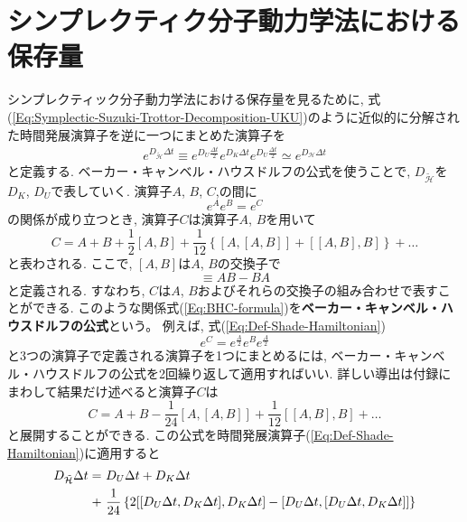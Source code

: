 \section{シンプレクティク分子動力学法における保存量}
シンプレクティック分子動力学法における保存量を見るために, 式(\ref{Eq:Symplectic-Suzuki-Trottor-Decomposition-UKU})のように近似的に分解された時間発展演算子を逆に一つにまとめた演算子を
\begin{align}
  e^{D_{\tilde{\mathcal{H}}} \Delta t}
  \equiv
  e^{D_{U} \frac{\Delta t}{2}}
  e^{D_{K} \Delta t}
  e^{D_{U} \frac{\Delta t}{2}}
  \simeq
  e^{D_{\mathcal{H}} \Delta t}
  \label{Eq:Def-Shade-Hamiltonian}
\end{align}
と定義する.
ベーカー・キャンベル・ハウスドルフの公式を使うことで, $D_{\tilde{\mathcal{H}}}$を$D_{K}$, $D_{U}$で表していく.
演算子$A$, $B$, $C$,の間に
\begin{equation}
  e^{A}e^{B} = e^{C}
\end{equation}
の関係が成り立つとき, 演算子$C$は演算子$A$, $B$を用いて
\begin{equation}
  C = A + B
    + \frac{1}{2} [A, B]
    + \frac{1}{12}
      \left\{
        [A, [A,B]] + [[A,B], B]
      \right\}
    + \ldots
  \label{Eq:BHC-formula}
\end{equation}
と表わされる. ここで, $[A, B]$は$A$, $B$の交換子で
\begin{equation}
  [A, B] \equiv AB - BA
\end{equation}
と定義される. すなわち, $C$は$A$, $B$およびそれらの交換子の組み合わせで表すことができる. 
このような関係式(\ref{Eq:BHC-formula})を\textbf{ベーカー・キャンベル・ハウスドルフの公式}という。
例えば, 式(\ref{Eq:Def-Shade-Hamiltonian})
\begin{equation}
  e^{C} = e^{\frac{A}{2}}e^{B}e^{\frac{A}{2}}
\end{equation}
と3つの演算子で定義される演算子を1つにまとめるには, ベーカー・キャンベル・ハウスドルフの公式を2回繰り返して適用すればいい. 詳しい導出は付録にまわして結果だけ述べると演算子$C$は
\begin{equation}
  C = A + B
    - \frac{1}{24}[A, [A,B]]
    + \frac{1}{12}[[A,B], B]
    + \ldots
\end{equation}
と展開することができる.
この公式を時間発展演算子(\ref{Eq:Def-Shade-Hamiltonian})に適用すると
\begin{align}
  D_{\Tilde{\mathcal{H}}} \Delta t
  =~&
  D_{U} \Delta t + D_{K} \Delta t
  \\ \notag
  +~&
  \frac{1}{24}
  \left\{
      2[[D_{U}\Delta t, D_{K}\Delta t], D_{K} \Delta t]
    -  [D_{U}\Delta t, [D_{U}\Delta t, D_{K}\Delta t]]
  \right\}
  \notag
\end{align}

